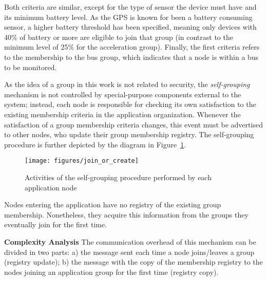Both criteria are similar, except for the type of sensor the device must have and its minimum battery level. As the GPS is known for been a battery consuming sensor, a higher battery threshold has been specified, meaning only devices with 40\% of battery or more are eligible to join that group (in contrast to the minimum level of 25\% for the acceleration group). Finally, the first criteria refers to the membership to the bus group, which indicates that a node is within a bus to be monitored.




As the idea of a group in this work is not related to security, the \textit{self-grouping} mechanism is not controlled by special-purpose components external to the system; instead, each node is responsible for checking its own satisfaction to the existing membership criteria in the application organization. Whenever the satisfaction of a group membership criteria changes, this event must be  advertised to other nodes, who update their group membership registry. 
The self-grouping procedure is further depicted by the diagram in Figure~\ref{fig:self_grouping}.
 
\begin{figure}[t!]
	\centering
	\texttt{[image: figures/join\_or\_create]}
	\caption{Activities of the self-grouping procedure performed by each application node}
	\label{fig:self_grouping}
\end{figure} 
 

Nodes entering the application have no registry of the existing group membership. Nonetheless, they acquire this information from the groups they eventually join for the first time. 

\textbf{Complexity Analysis} The communication overhead of this mechanism can be divided in two parts: a) the message sent each time a node joins/leaves a group (registry update); b) the message with the copy of the membership registry to the nodes joining an application group for the first time (registry copy). 

